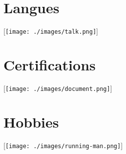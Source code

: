 \documentclass[10pt,a4paper,sans]{moderncv}
\begin{document}
\begin{minipage}[t]{0.5\textwidth}
\section{Langues}[\texttt{[image: ./images/talk.png]}]
\end{minipage}
\begin{minipage}[t]{0.5\textwidth}
\section{Certifications}[\texttt{[image: ./images/document.png]}]
\end{minipage}

\bigbreak
\bigbreak

\begin{minipage}[t]{0.5\textwidth}
\section{Hobbies}[\texttt{[image: ./images/running-man.png]}]
\end{minipage}
\end{document}

